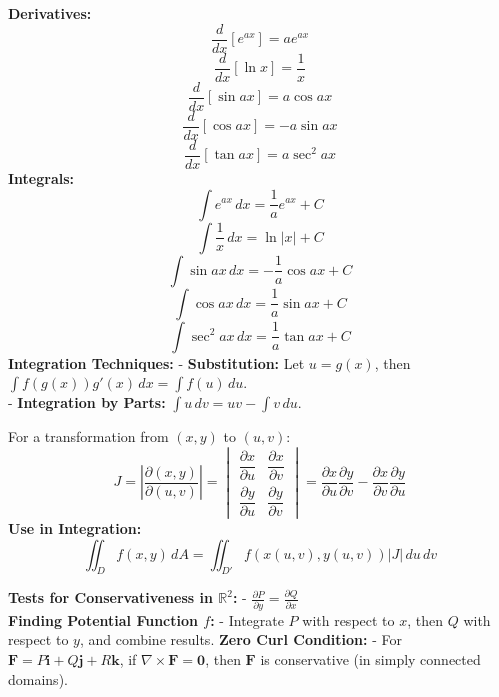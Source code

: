 \documentclass[2pt]{article}
\begin{document}
\begin{multicols}{2}
\begin{tcolorbox}[title=\textbf{Common Derivatives and Integrals}, colframe=lightyellow]
    \textbf{Derivatives:}
    \[ \frac{d}{dx} [e^{ax}] = a e^{ax} \]
    \[ \frac{d}{dx} [\ln x] = \frac{1}{x} \]
    \[ \frac{d}{dx} [\sin ax] = a \cos ax \]
    \[ \frac{d}{dx} [\cos ax] = -a \sin ax \]
    \[ \frac{d}{dx} [\tan ax] = a \sec^2 ax \]
    \textbf{Integrals:}
    \[ \int e^{ax} \, dx = \frac{1}{a} e^{ax} + C \]
    \[ \int \frac{1}{x} \, dx = \ln |x| + C \]
    \[ \int \sin ax \, dx = -\frac{1}{a} \cos ax + C \]
    \[ \int \cos ax \, dx = \frac{1}{a} \sin ax + C \]
    \[ \int \sec^2 ax \, dx = \frac{1}{a} \tan ax + C \]
    \textbf{Integration Techniques:}
    - \textbf{Substitution:} Let \( u = g(x) \), then \( \int f(g(x)) g'(x) \, dx = \int f(u) \, du \). \\
    - \textbf{Integration by Parts:} \( \int u \, dv = uv - \int v \, du \).
\end{tcolorbox}

\begin{tcolorbox}[title=\textbf{Jacobian Determinant}, colframe=lightgreen]
    For a transformation from \( (x, y) \) to \( (u, v) \):
    \[ J = \left| \frac{\partial(x, y)}{\partial(u, v)} \right| = 
    \begin{vmatrix}
    \dfrac{\partial x}{\partial u} & \dfrac{\partial x}{\partial v} \\[2ex]
    \dfrac{\partial y}{\partial u} & \dfrac{\partial y}{\partial v}
    \end{vmatrix}
    = \frac{\partial x}{\partial u} \frac{\partial y}{\partial v} - \frac{\partial x}{\partial v} \frac{\partial y}{\partial u} \]
    \textbf{Use in Integration:}
    \[ \iint_D f(x, y) \, dA = \iint_{D'} f(x(u, v), y(u, v)) \left| J \right| \, du \, dv \]
\end{tcolorbox}

\begin{tcolorbox}[title=\textbf{Conservative Vector Fields}, colframe=lightblue]
    \textbf{Tests for Conservativeness in \( \mathbb{R}^2 \):}
    - \( \frac{\partial P}{\partial y} = \frac{\partial Q}{\partial x} \) \\
    \textbf{Finding Potential Function \( f \):}
    - Integrate \( P \) with respect to \( x \), then \( Q \) with respect to \( y \), and combine results.
    \textbf{Zero Curl Condition:}
    - For \( \mathbf{F} = P \mathbf{i} + Q \mathbf{j} + R \mathbf{k} \), if \( \nabla \times \mathbf{F} = \mathbf{0} \), then \( \mathbf{F} \) is conservative (in simply connected domains).
\end{tcolorbox}


\end{multicols}
\end{document}
